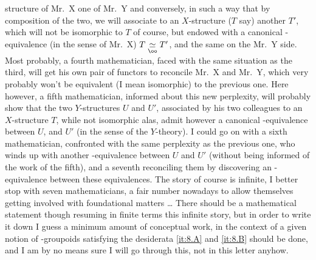 structure of Mr.\ X one of Mr.\ Y and conversely, in such a way that
by composition of the two, we will associate to an $X$-structure ($T$
say) another $T'$, which will not be isomorphic to $T$ of course, but
endowed with a canonical \oo-equivalence (in the sense of Mr.\ X) $T
\underset{\oo}{\simeq } T'$, and the same on the Mr.\ Y side. Most
probably, a fourth mathematician, faced with the same situation as the
third, will get his own pair of functors to reconcile Mr.\ X and Mr.\
Y, which very probably won't be equivalent (I mean isomorphic) to the
previous one. Here however, a fifth mathematician, informed about this
new perplexity, will probably show that the two $Y$-structures $U$ and
$U'$, associated by his two colleagues to an $X$-structure $T$, while
not isomorphic alas, admit however a canonical \oo-equivalence between
$U$, and $U'$ (in the sense of the $Y$-theory). I could go on with a
sixth mathematician, confronted with the same perplexity as the
previous one, who winds up with another \oo-equivalence between $U$
and $U'$ (without being informed of the work of the fifth), and a
seventh reconciling them by discovering an \oo-equivalence between
these equivalences. The story of course is infinite, I better stop
with seven mathematicians, a fair number nowadays to allow themselves
getting involved with foundational matters \ldots
There should be a mathematical statement though resuming in finite
terms this infinite story, but in order to write it down I guess a
minimum amount of conceptual work, in the context of a given notion of
\oo-groupoids satisfying the desiderata \ref{it:8.A} and \ref{it:8.B}
should be done, and I am by no means sure I will go through this, not
in this letter anyhow.


